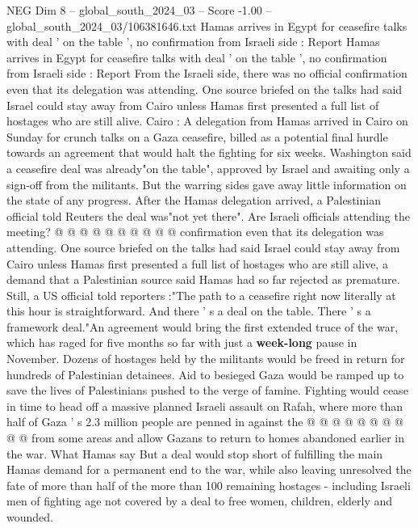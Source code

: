 \begin{textsample}{NEG Dim 8 – global\_south\_2024\_03 – Score -1.00 – global\_south\_2024\_03/106381646.txt}  \label{ex:f8_neg_026}
Hamas arrives in Egypt for ceasefire talks with deal ' on the table ', no confirmation from Israeli side : Report Hamas arrives in Egypt for ceasefire talks with deal ' on the table ', no confirmation from Israeli side : Report From the Israeli side, there was no official confirmation even that its delegation was attending.
One source briefed on the talks had said Israel could stay away from Cairo unless Hamas first presented a full list of hostages who are still alive.
Cairo : A delegation from Hamas arrived in Cairo on Sunday for crunch talks on a Gaza ceasefire, billed as a potential final hurdle towards an agreement that would halt the fighting for six weeks.
Washington said a ceasefire deal was already"on the table", approved by Israel and awaiting only a sign-off from the militants.
But the warring sides gave away little information on the state of any progress.
After the Hamas delegation arrived, a Palestinian official told Reuters the deal was"not yet there".
Are Israeli officials attending the meeting? @ @ @ @ @ @ @ @ @ @ confirmation even that its delegation was attending.
One source briefed on the talks had said Israel could stay away from Cairo unless Hamas first presented a full list of hostages who are still alive, a demand that a Palestinian source said Hamas had so far rejected as premature.
Still, a US official told reporters :"The path to a ceasefire right now literally at this hour is straightforward.
And there ' s a deal on the table.
There ' s a framework deal."An agreement would bring the first extended truce of the war, which has raged for five months so far with just a \textbf{week-long} pause in November.
Dozens of hostages held by the militants would be freed in return for hundreds of Palestinian detainees.
Aid to besieged Gaza would be ramped up to save the lives of Palestinians pushed to the verge of famine.
Fighting would cease in time to head off a massive planned Israeli assault on Rafah, where more than half of Gaza ' s 2.3 million people are penned in against the @ @ @ @ @ @ @ @ @ @ from some areas and allow Gazans to return to homes abandoned earlier in the war.
What Hamas say But a deal would stop short of fulfilling the main Hamas demand for a permanent end to the war, while also leaving unresolved the fate of more than half of the more than 100 remaining hostages - including Israeli men of fighting age not covered by a deal to free women, children, elderly and wounded.

\end{textsample}
